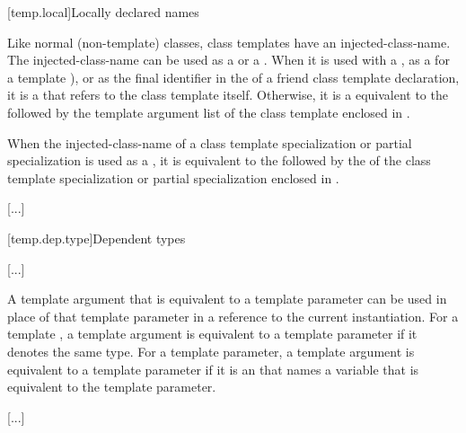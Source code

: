 \documentclass{wg21}
\begin{document}
[temp.local]{Locally declared names}

\pnum
Like normal (non-template) classes, class templates have an
injected-class-name.
The
injected-class-name can be used
as a  or a .
When it is used with a
,
as a  for a template ),
or as the final identifier in the  of
a friend class template declaration,
it is a  that refers to the
class template itself.
Otherwise, it is a 
equivalent to the 
followed by
the template argument list
of the class template
enclosed in \tcode{<>}.

\pnum
When the injected-class-name of a class template specialization or
partial specialization is used as a ,
it is equivalent to the  followed by the
of the class template specialization or partial
specialization enclosed in
\tcode{<>}.

\textcolor{noteclr}{[...]}

[temp.dep.type]{Dependent types}

\textcolor{noteclr}{[...]}

\pnum
A template argument that is equivalent to a template
parameter can be used in place of that
template parameter in a reference to the current instantiation.
For a template ,
a template argument is equivalent to a template parameter
if it denotes the same type.
For a  template parameter,
a template argument is equivalent to a template parameter
if it is an  that names a variable
that is equivalent to the template parameter.

\textcolor{noteclr}{[...]}
\end{document}
